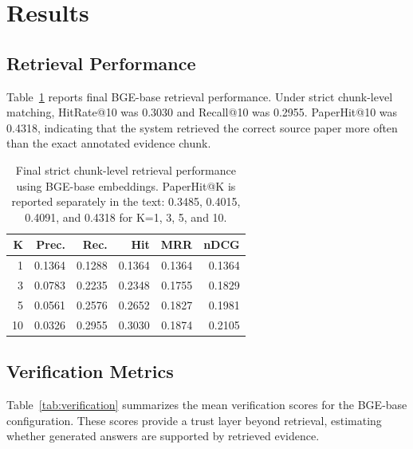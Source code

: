 \documentclass[11pt]{article}
\newcommand{\tablefont}{\footnotesize}
\begin{document}
\section{Results}

\subsection{Retrieval Performance}

Table~\ref{tab:retrieval} reports final BGE-base retrieval performance. Under strict chunk-level matching, HitRate@10 was 0.3030 and Recall@10 was 0.2955. PaperHit@10 was 0.4318, indicating that the system retrieved the correct source paper more often than the exact annotated evidence chunk.

\begin{table}[t]
\centering
\tablefont
\setlength{\tabcolsep}{3pt}
\begin{tabular}{rrrrrr}
\hline
\textbf{K} & \textbf{Prec.} & \textbf{Rec.} & \textbf{Hit} & \textbf{MRR} & \textbf{nDCG} \\
\hline
1 & 0.1364 & 0.1288 & 0.1364 & 0.1364 & 0.1364 \\
3 & 0.0783 & 0.2235 & 0.2348 & 0.1755 & 0.1829 \\
5 & 0.0561 & 0.2576 & 0.2652 & 0.1827 & 0.1981 \\
10 & 0.0326 & 0.2955 & 0.3030 & 0.1874 & 0.2105 \\
\hline
\end{tabular}
\caption{Final strict chunk-level retrieval performance using BGE-base embeddings. PaperHit@K is reported separately in the text: 0.3485, 0.4015, 0.4091, and 0.4318 for K=1, 3, 5, and 10.}
\label{tab:retrieval}
\end{table}

\subsection{Verification Metrics}

Table~\ref{tab:verification} summarizes the mean verification scores for the BGE-base configuration. These scores provide a trust layer beyond retrieval, estimating whether generated answers are supported by retrieved evidence.
\end{document}
